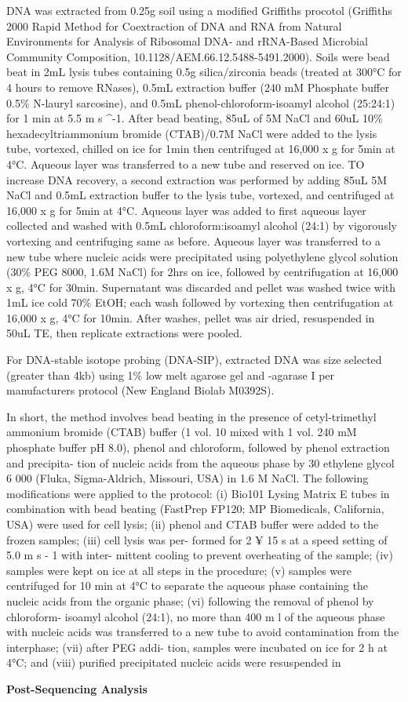 DNA was extracted from 0.25g soil using a modified Griffiths procotol (Griffiths 2000 Rapid Method for Coextraction of DNA and RNA from Natural Environments for Analysis of Ribosomal DNA- and rRNA-Based Microbial Community Composition, 10.1128/AEM.66.12.5488-5491.2000).  Soils were bead beat in 2mL lysis tubes containing 0.5g silica/zirconia beads (treated at 300°C for 4 hours to remove RNases), 0.5mL extraction buffer (240 mM Phosphate buffer
0.5\% N-lauryl sarcosine), and 0.5mL phenol-chloroform-isoamyl alcohol (25:24:1) for 1 min at 5.5 m s ^{-1}.  After bead beating, 85uL of 5M NaCl and 60uL 10\% hexadecyltriammonium bromide (CTAB)/0.7M NaCl were added to the lysis tube, vortexed, chilled on ice for 1min then centrifuged at 16,000 x g for 5min at 4°C.  Aqueous layer was transferred to a new tube and reserved on ice.  TO increase DNA recovery, a second extraction was performed by adding 85uL 5M NaCl and 0.5mL extraction buffer to the lysis tube, vortexed, and centrifuged at 16,000 x g for 5min at 4°C.  Aqueous layer was added to first aqueous layer collected and washed with 0.5mL chloroform:isoamyl alcohol (24:1) by vigorously vortexing and centrifuging same as before.  Aqueous layer was transferred to a new tube where nucleic acids were precipitated using polyethylene glycol solution (30\% PEG 8000, 1.6M NaCl) for 2hrs on ice, followed by centrifugation at 16,000 x g, 4°C for 30min.  Supernatant was discarded and pellet was washed twice with 1mL ice cold 70\% EtOH; each wash followed by vortexing then centrifugation at 16,000 x g, 4°C for 10min.  After washes, pellet was air dried, resuspended in 50uL TE, then replicate extractions were pooled.  

For DNA-stable isotope probing (DNA-SIP), extracted DNA was size selected (greater than 4kb) using 1\% low melt agarose gel and \beta -agarase I per manufacturers protocol (New England Biolab M0392S).          

In short, the method involves
bead beating in the presence of cetyl-trimethyl ammonium
bromide (CTAB) buffer (1 vol. 10%
mixed with 1 vol. 240 mM phosphate buffer pH 8.0), phenol
and chloroform, followed by phenol extraction and precipita-
tion of nucleic acids from the aqueous phase by 30%
ethylene glycol 6 000 (Fluka, Sigma-Aldrich, Missouri, USA)
in 1.6 M NaCl. The following modifications were applied to the
protocol: (i) Bio101 Lysing Matrix E tubes in combination with
bead beating (FastPrep FP120; MP Biomedicals, California,
USA) were used for cell lysis; (ii) phenol and CTAB buffer
were added to the frozen samples; (iii) cell lysis was per-
formed for 2
¥
15 s at a speed setting of 5.0 m s
-
1
with inter-
mittent cooling to prevent overheating of the sample; (iv)
samples were kept on ice at all steps in the procedure; (v)
samples were centrifuged for 10 min at 4°C to separate the
aqueous phase containing the nucleic acids from the organic
phase; (vi) following the removal of phenol by chloroform-
isoamyl alcohol (24:1), no more than 400
m
l of the aqueous
phase with nucleic acids was transferred to a new tube to
avoid contamination from the interphase; (vii) after PEG addi-
tion, samples were incubated on ice for 2 h at 4°C; and (viii)
purified precipitated nucleic acids were resuspended in


\textbf{Post-Sequencing Analysis}
 